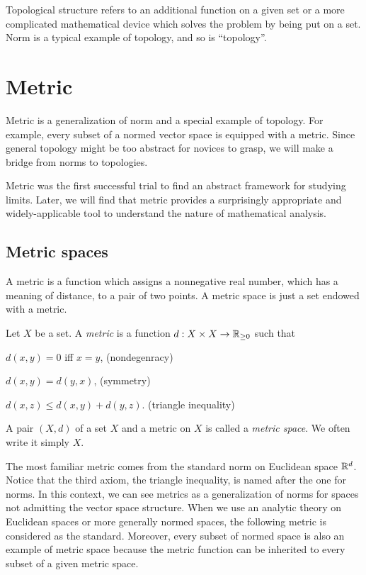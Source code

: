 \documentclass{../crs}
\begin{document}
Topological structure refers to an additional function on a given set or a more complicated mathematical device which solves the problem by being put on a set.
Norm is a typical example of topology, and so is ``topology''.


\section{Metric}

Metric is a generalization of norm and a special example of topology.
For example, every subset of a normed vector space is equipped with a metric.
Since general topology might be too abstract for novices to grasp, we will make a bridge from norms to topologies.

Metric was the first successful trial to find an abstract framework for studying limits.
Later, we will find that metric provides a surprisingly appropriate and widely-applicable tool to understand the nature of mathematical analysis.

\subsection{Metric spaces}

A metric is a function which assigns a nonnegative real number, which has a meaning of distance, to a pair of two points.
A metric space is just a set endowed with a metric.

\begin{defn}
Let $X$ be a set.
A \emph{metric} is a function $d:X\x X\to\R_{\ge0}$ such that
\begin{cond}
\item $d(x,y)=0$ iff $x=y$, \hfill(nondegenracy)
\item $d(x,y)=d(y,x)$, \hfill(symmetry)
\item $d(x,z)\le d(x,y)+d(y,z)$. \hfill(triangle inequality)
\end{cond}
A pair $(X,d)$ of a set $X$ and a metric on $X$ is called a \emph{metric space}.
We often write it simply $X$.
\end{defn}

The most familiar metric comes from the standard norm on Euclidean space $\mathbb{R}^d$.
Notice that the third axiom, the triangle inequality, is named after the one for norms.
In this context, we can see metrics as a generalization of norms for spaces not admitting the vector space structure.
When we use an analytic theory on Euclidean spaces or more generally normed spaces, the following metric is considered as the standard.
Moreover, every subset of normed space is also an example of metric space because the metric function can be inherited to every subset of a given metric space.
\end{document}
